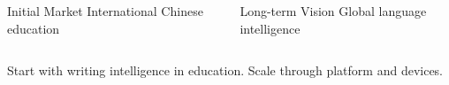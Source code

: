{\begin{columns}[T,onlytextwidth]
\SBMiniNode{\linewidth}
{Initial Market}
{International Chinese education}

\SBMiniNode{\linewidth}
{Long-term Vision}
{Global language intelligence}

\end{columns}

\vspace{0.35cm}

\begin{center}
{\SBFontBody\fontsize{9}{11}\selectfont\color{SBGray}
Start with writing intelligence in education. Scale through platform and devices.
}
\end{center}

}